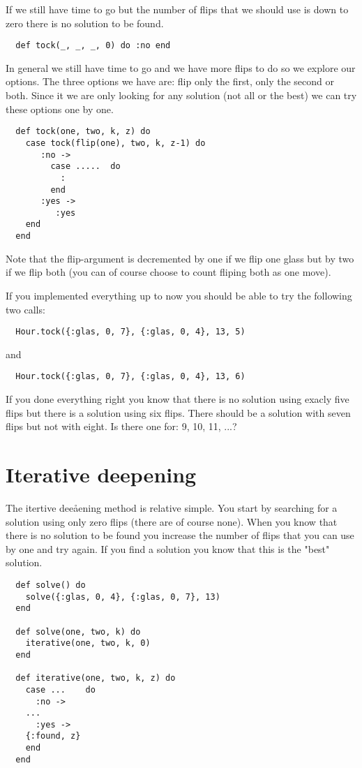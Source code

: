 \documentclass[a4paper,11pt]{article}
\begin{document}
If we still have time to go but the number of flips that we should use
is down to zero there is no solution to be found.

\begin{verbatim}
  def tock(_, _, _, 0) do :no end  
\end{verbatim}

In general we still have time to go and we have more flips to do so we
explore our options. The three options we have are: flip only the
first, only the second or both. Since it we are only looking for any
solution (not all or the best) we can try these options one by one. 

\begin{verbatim}
  def tock(one, two, k, z) do
    case tock(flip(one), two, k, z-1) do 
       :no ->
         case .....  do
           :
         end
       :yes ->
          :yes     
    end
  end 
\end{verbatim}

Note that the flip-argument is decremented by one if we flip one glass
but by two if we flip both (you can of course choose to count fliping
both as one move).

If you implemented everything up to now you should be able to try the
following two calls:

\begin{verbatim}
  Hour.tock({:glas, 0, 7}, {:glas, 0, 4}, 13, 5)
\end{verbatim}
and
\begin{verbatim}
  Hour.tock({:glas, 0, 7}, {:glas, 0, 4}, 13, 6)
\end{verbatim}

If you done everything right you know that there is no solution using
exacly five flips but there is a solution using six flips. There
should be a solution with seven flips but not with eight. Is there one
for: 9, 10, 11, ...?

\section*{Iterative deepening}

The itertive deeåening method is relative simple. You start by
searching for a solution using only zero flips (there are of course
none). When you know that there is no solution to be found you
increase the number of flips that you can use by one and try again. If
you find a solution you know that this is the "best" solution.


\begin{verbatim}
  def solve() do
    solve({:glas, 0, 4}, {:glas, 0, 7}, 13)
  end
  
  def solve(one, two, k) do
    iterative(one, two, k, 0)
  end
  
  def iterative(one, two, k, z) do
    case ...    do
      :no ->
	...
      :yes ->
	{:found, z}
    end
  end
\end{verbatim}
\end{document}
